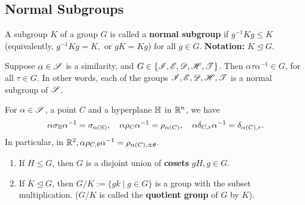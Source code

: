 \subsection{Normal Subgroups}

\begin{definition}
    A subgroup \(K\) of a group \(G\) is called a \textbf{normal subgroup} if \(g^{-1}Kg \leq K\) (equivalently, \(g^{-1}Kg = K, \) or \(gK = Kg\)) for all \(g \in G\). \textbf{Notation: } \(K \trianglelefteq G\).
\end{definition}

\begin{theorem}
    Suppose \(\alpha \in \mathscr{S}\) is a similarity, and \(G \in \{\mathscr{I}, \mathscr{E}, \mathscr{D}, \mathscr{H}, \mathscr{T}\}\). Then \(\alpha \tau \alpha^{-1} \in G\), for all \(\tau \in G\). In other words, each of the groups \(\mathscr{I}, \mathscr{E}, \mathscr{D},\mathscr{H},\mathscr{T}\) is a normal subgroup of \(\mathscr{S}\).
\end{theorem}

\begin{corollary}
    For \(\alpha \in \mathscr{S}\), a point \(C\) and a hyperplane \(\mathbb{H}\) in \(\mathbb{R}^n\), we have
    \[\alpha\sigma_{\mathbb{H}}\alpha^{-1} = \sigma_{\alpha(\mathbb{H})}, \quad \alpha\rho_C\alpha^{-1} = \rho_{\alpha(C)}, \quad \alpha\delta_{C, r}\alpha^{-1} = \delta_{\alpha(C), r}.\]
    In particular, in \(\mathbb{R}^2, \alpha\rho_{C, \theta}\alpha^{-1} = \rho_{\alpha(C), \pm \theta}\).
\end{corollary}

\begin{proposition}
    \begin{enumerate}
        \item If \(H \leq G\), then \(G\) is a disjoint union of \textbf{cosets} \(gH, g \in G\).
        \item If \(K \trianglelefteq G\), then \(G / K := \{gk \mid g \in G \}\) is a group with the subset multiplication. (\(G / K\) is called the \textbf{quotient group} of \(G\) by \(K\)).
    \end{enumerate}
\end{proposition}